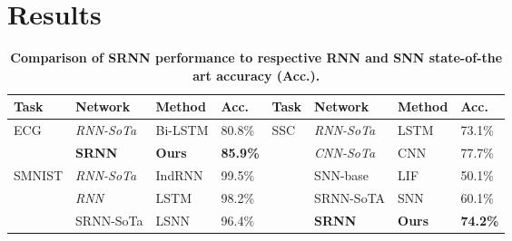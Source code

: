 \documentclass[fleqn,10pt]{wlscirep}
\begin{document}
\section*{Results}



\begin{table}[]
\centering
\caption{\textbf{Comparison of SRNN performance to respective RNN and SNN state-of-the art accuracy (Acc.).}}
\begin{tabular}{|l|l|l|l|l|l|l|l|}
\hline
Task                     & Network                                & Method                                          & Acc.                                  & Task                   & Network                                                       & Method                                                    & Acc.                                                     \\ \hline
\multirow{2}{*}{ECG}     & \em RNN-SoTa            & Bi-LSTM                                         & 80.8\%                                   & \multirow{5}{*}{SSC}   & \em  RNN-SoTa                                  & LSTM\cite{cramer2019heidelberg}          & 73.1\%                                                       \\ \cline{2-4} \cline{6-8} 
                         & \cellcolor{green}\bf SRNN & \cellcolor{green}\bf Ours          & \cellcolor{green}\bf 85.9\%  &                        & \em CNN-SoTa                                   & CNN\cite{cramer2019heidelberg}           & 77.7\%                                                       \\ \cline{1-4} \cline{6-8} 
\multirow{4}{*}{SMNIST}  & \em RNN-SoTa            & IndRNN\cite{li2018independently}        & 99.5\%                                   &                        & SNN-base                                                      & LIF \cite{cramer2019heidelberg}          & 50.1\%                                                      \\ \cline{2-4} \cline{6-8} 
                         & \em RNN                 & LSTM\cite{arjovsky2016unitary} & 98.2\%                                    &                        & SRNN-SoTA                        &      SNN\cite{perez2021neural}               & 60.1\%                      \\ \cline{2-4} \cline{6-8} 
                         & SRNN-SoTa                              & LSNN\cite{bellec2018long}      & 96.4\%                                    &                        &\cellcolor{green}\bf SRNN                        & \cellcolor{green}\bf Ours                    & \cellcolor{green}\bf 74.2\%                                                              \\ \cline{2-8} 

\end{tabular}
\end{table}
\end{document}
